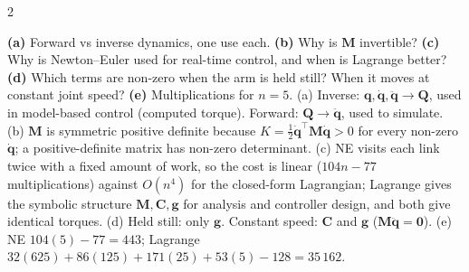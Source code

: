 \begin{multicols}{2}
\begin{examq}
\textbf{(a)} Forward vs inverse dynamics, one use each. \textbf{(b)} Why is $\mathbf M$ invertible? \textbf{(c)} Why is Newton--Euler used for real-time control, and when is Lagrange better? \textbf{(d)} Which terms are non-zero when the arm is held still? When it moves at constant joint speed? \textbf{(e)} Multiplications for $n=5$.
\solution
(a) Inverse: $\mathbf q,\dot{\mathbf q},\ddot{\mathbf q}\to\mathbf Q$, used in model-based control (computed torque). Forward: $\mathbf Q\to\ddot{\mathbf q}$, used to simulate. (b) $\mathbf M$ is symmetric positive definite because $K=\tfrac12\dot{\mathbf q}^\top\mathbf M\dot{\mathbf q}>0$ for every non-zero $\dot{\mathbf q}$; a positive-definite matrix has non-zero determinant. (c) NE visits each link twice with a fixed amount of work, so the cost is linear ($104n-77$ multiplications) against $O(n^4)$ for the closed-form Lagrangian; Lagrange gives the symbolic structure $\mathbf M,\mathbf C,\mathbf g$ for analysis and controller design, and both give identical torques. (d) Held still: only $\mathbf g$. Constant speed: $\mathbf C$ and $\mathbf g$ ($\mathbf M\ddot{\mathbf q}=\mathbf 0$). (e) NE $104(5)-77=443$; Lagrange $32(625)+86(125)+171(25)+53(5)-128=35\,162$. \chk
\end{examq}
\end{multicols}
